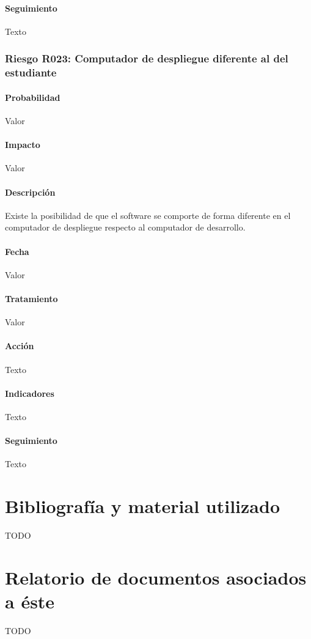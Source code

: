 \documentclass[10pt,a4paper]{article}
\begin{document}
				\paragraph{Seguimiento}	Texto %
				\subsubsection{Riesgo R023: Computador de despliegue diferente al del estudiante}
				\paragraph{Probabilidad} Valor
				\paragraph{Impacto}	Valor
				\paragraph{Descripción} Existe la posibilidad de que el software se comporte de forma diferente en el computador de despliegue respecto al computador de desarrollo.
				\paragraph{Fecha} Valor %
				\paragraph{Tratamiento} Valor %
				\paragraph{Acción} Texto %
				\paragraph{Indicadores} Texto %
				\paragraph{Seguimiento}	Texto %

				
	\appendix
		\section{Bibliografía y material utilizado}
			TODO %
			
		\section{Relatorio de documentos asociados a éste}
			TODO %
\end{document}
